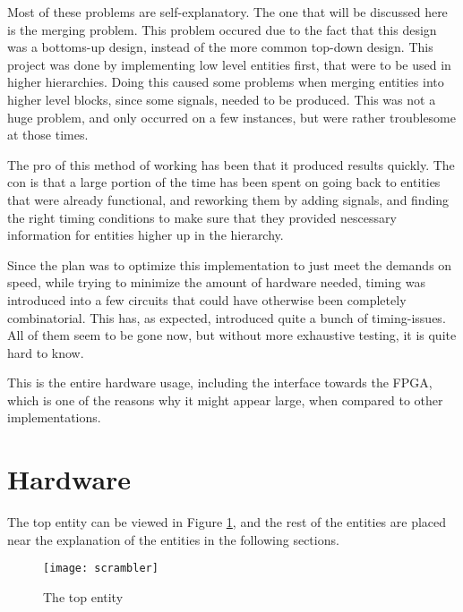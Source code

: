 Most of these problems are self-explanatory. The one that 
will be discussed here is the merging problem. This problem occured 
due to the fact that this design was a bottoms-up design, instead of 
the more common top-down design. This project was done by implementing 
low level entities first, that were to be used in higher hierarchies. 
Doing this caused some problems when merging entities into higher level 
blocks, since some signals, needed to be produced. This was not a huge 
problem, and only occurred on a few instances, but were rather 
troublesome at those times.

The pro of this method of working has been that it produced results 
quickly. The con is that a large portion of the time has been 
spent on going back to entities that were already functional, and 
reworking them by adding signals, and finding the right timing 
conditions to make sure that they provided nescessary information for 
entities higher up in the hierarchy.

Since the plan was to optimize this implementation to just meet the 
demands on speed, while trying to minimize the amount of hardware 
needed, timing was introduced into a few circuits that could have 
otherwise been completely combinatorial. This has, as expected, 
introduced quite a bunch of timing-issues. All of them seem to be gone 
now, but without more exhaustive testing, it is quite hard to know.


This is the entire hardware usage, including the interface towards the 
FPGA, which is one of the reasons why it might appear large, when 
compared to other implementations.

\section{Hardware}
The top entity can be viewed in Figure \ref{b:scr}, and the rest of the 
entities are placed near the explanation of the entities in the 
following sections.

\begin{figure}
  \texttt{[image: scrambler]}
  \caption{The top entity}
  \label{b:scr}
\end{figure}

